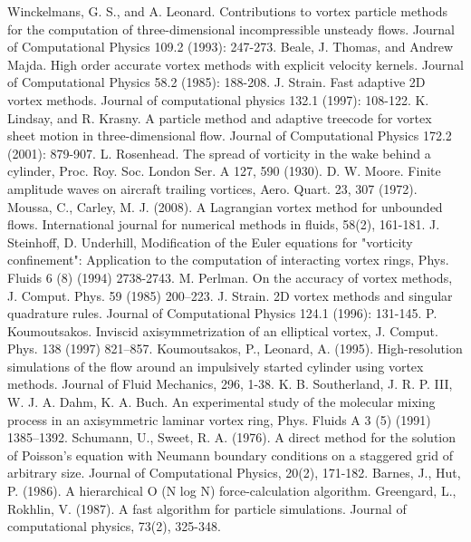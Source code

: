 \documentclass[letterpaper,12pt]{report}
\begin{document}
\begin{thebibliography}{9}
Winckelmans, G. S., and A. Leonard. Contributions to vortex particle methods for the computation of three-dimensional incompressible unsteady flows. Journal of Computational Physics 109.2 (1993): 247-273.
Beale, J. Thomas, and Andrew Majda. High order accurate vortex methods with explicit velocity kernels. Journal of Computational Physics 58.2 (1985): 188-208.
J. Strain. Fast adaptive 2D vortex methods. Journal of computational physics 132.1 (1997): 108-122.
K. Lindsay, and R. Krasny. A particle method and adaptive treecode for vortex sheet motion in three-dimensional flow. Journal of Computational Physics 172.2 (2001): 879-907.
L. Rosenhead. The spread of vorticity in the wake behind a cylinder, Proc. Roy. Soc. London Ser. A 127, 590 (1930).
D. W. Moore. Finite amplitude waves on aircraft trailing vortices, Aero. Quart. 23, 307 (1972).
Moussa, C., Carley, M. J. (2008). A Lagrangian vortex method for unbounded flows. International journal for numerical methods in fluids, 58(2), 161-181.
J. Steinhoff, D. Underhill, Modification of the Euler equations for "vorticity confinement": Application to the computation of interacting vortex rings, Phys. Fluids 6 (8) (1994) 2738-2743.
M. Perlman. On the accuracy of vortex methods, J. Comput. Phys. 59 (1985) 200–223.
J. Strain. 2D vortex methods and singular quadrature rules. Journal of Computational Physics 124.1 (1996): 131-145.
P. Koumoutsakos. Inviscid axisymmetrization of an elliptical vortex, J. Comput. Phys. 138 (1997) 821–857.
Koumoutsakos, P., Leonard, A. (1995). High-resolution simulations of the flow around an impulsively started cylinder using vortex methods. Journal of Fluid Mechanics, 296, 1-38.
K. B. Southerland, J. R. P. III, W. J. A. Dahm, K. A. Buch. An experimental study of the molecular mixing process in an axisymmetric laminar vortex ring, Phys. Fluids A 3 (5) (1991) 1385–1392.
Schumann, U., Sweet, R. A. (1976). A direct method for the solution of Poisson's equation with Neumann boundary conditions on a staggered grid of arbitrary size. Journal of Computational Physics, 20(2), 171-182.
Barnes, J.,  Hut, P. (1986). A hierarchical O (N log N) force-calculation algorithm.
Greengard, L.,  Rokhlin, V. (1987). A fast algorithm for particle simulations. Journal of computational physics, 73(2), 325-348.

\end{thebibliography}
\end{document}
